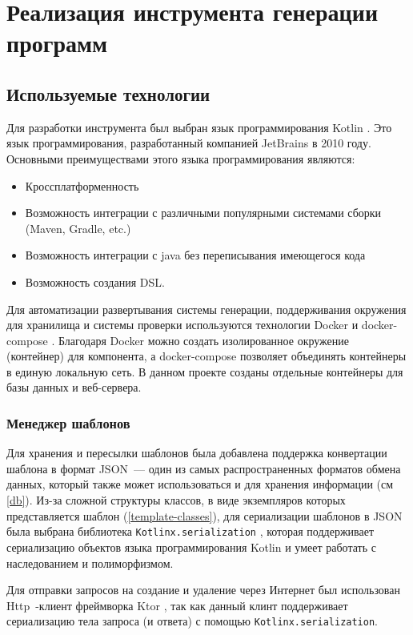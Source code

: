 \section{Реализация инструмента генерации программ}

\subsection{Используемые технологии}

Для разработки инструмента был выбран язык программирования Kotlin \cite{kotlin}. Это язык
программирования, разработанный компанией JetBrains в 2010 году. Основными
преимуществами этого языка программирования являются:
\begin{itemize}
    \item Кроссплатформенность
    \item Возможность интеграции с различными популярными системами сборки
          (Maven, Gradle, etc.)
    \item Возможность интеграции с java без переписывания имеющегося кода
    \item Возможность создания DSL.
\end{itemize}

Для автоматизации развертывания системы генерации, поддерживания окружения для хранилища и
системы проверки используются технологии Docker \cite{docker} и docker-compose \cite{docker-compose}.
Благодаря Docker можно создать изолированное окружение (контейнер) для компонента, а docker-compose
позволяет объединять контейнеры в единую локальную сеть. В данном проекте созданы отдельные
контейнеры для базы данных и веб-сервера.


\subsubsection{Менеджер шаблонов}
Для хранения и пересылки шаблонов была добавлена поддержка конвертации шаблона в формат JSON~---
один из самых распространенных форматов обмена данных, который также может использоваться и для
хранения информации (см \ref{db}). Из-за сложной структуры классов,
в виде экземпляров которых представляется шаблон (\ref{template-classes}), для сериализации шаблонов в
JSON была выбрана библиотека \texttt{Kotlinx.serialization} \cite{kotlinx-serialization},
которая поддерживает сериализацию объектов языка программирования Kotlin и умеет работать
с наследованием и полиморфизмом.

Для отправки запросов на создание и удаление через Интернет был использован
Http~-клиент фреймворка Ktor \cite{ktor}, так как данный клинт поддерживает
сериализацию тела запроса (и ответа) с помощью \texttt{Kotlinx.serialization}.

